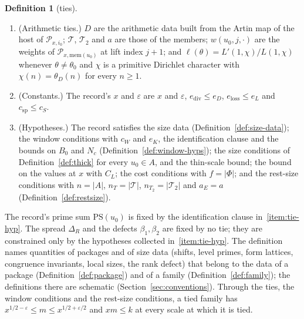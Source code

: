 \documentclass[11pt]{amsbook}
\theoremstyle{plain}
\theoremstyle{definition}
\newtheorem{definition}[theorem]{Definition}
\theoremstyle{remark}
\numberwithin{equation}{section}
\numberwithin{figure}{chapter}
\numberwithin{table}{chapter}
\newcommand{\eps}{\varepsilon}
\newcommand{\PS}{\mathrm{PS}}
\newcommand{\Top}{\mathcal{T}}
\newcommand{\Cg}{\mathrm{Cg}}
\newcommand{\Fo}{\mathrm{Fo}}
\newcommand{\Ga}{\mathrm{Ga}}
\newcommand{\IO}{\mathrm{IO}}
\begin{document}
\begin{definition}[ties]
\begin{enumerate}[label=(\arabic*)]
$\mu_M^{\max}(u)$ are the slope and the maximal slope of the form
lattice of $u$; and
\[
\Cg_j(u)=\sum_{\mathfrak p}\operatorname{sz}_{\mathfrak p}
\bigl(\text{congruence invariant of $u$ at lift index $j+1$}\bigr),
\]
the sum over the places $\mathfrak p$ of the support of the size
datum, with $\operatorname{sz}_{\mathfrak p}$ its local sizes.
For the shift itself, $\mu_R(u_0)$ and $\mu_R^{\min}(u_0)$ are the slope and the
minimal slope of $R^\vee$; $\Fo(u_0)$ and $\Ga(u_0)$ are those of the
size datum; $\IO(u_0)$ is a sum over the support of
local quantities of the size datum; and $\beta_0(u_0)$ is the rank
defect of the member.
\item (Arithmetic ties.) $D$ are the arithmetic data built from the
Artin map of the host of $\mathcal P_{x,i_0}$; $\Top$, $\Top_2$ and
$a$ are those of the members; $w(u_0,j,\cdot)$ are the weights of
$\mathcal P_{x,\mathrm{mem}(u_0)}$ at lift index $j+1$; and
$\ell(\theta)=L'(1,\chi)/L(1,\chi)$ whenever $\theta\ne\theta_0$ and
$\chi$ is a primitive Dirichlet character with $\chi(n)=\theta_D(n)$
for every $n\ge1$.
\item (Constants.) The record's $x$ and $\eps$ are $x$ and $\eps$,
$e_{\mathrm{div}}\le e_D$, $e_{\mathrm{loss}}\le e_L$ and
$c_{\mathrm{sp}}\le c_S$.
\item\label{item:tie-hyp} (Hypotheses.) The record satisfies the size data
(Definition~\ref{def:size-data}); the window conditions with $c_W$ and
$e_K$, the identification clause and the bounds on $B_0$ and $N_c$
(Definition~\ref{def:window-hyps}); the size conditions of
Definition~\ref{def:thick} for every $u_0\in A$, and the thin-scale
bound; the bound on the values at $x$ with $C_L$; the cost conditions
with $f=|\Phi|$; and the rest-size conditions with $n=|A|$,
$n_T=|\Top|$, $n_{T_2}=|\Top_2|$ and $a_E=a$
(Definition~\ref{def:restsize}).
\end{enumerate}
\end{definition}

\noindent The record's prime sum $\PS(u_0)$ is fixed by the
identification clause in~\ref{item:tie-hyp}. The spread $\Delta_R$ and the
defects
$\beta_1,\beta_2$ are fixed by no tie; they are constrained only by
the hypotheses collected in~\ref{item:tie-hyp}. The definition names quantities
of
packages and of size data (shifts, level primes, form lattices,
congruence invariants, local sizes, the rank defect) that belong to the data of
a
package (Definition~\ref{def:package}) and of a family
(Definition~\ref{def:family}); the definitions there are schematic
(Section~\ref{sec:conventions}). Through
the ties, the window conditions and the rest-size conditions, a tied
family has $x^{1/2-\eps}\le m\le x^{1/2+\eps/2}$ and $xm\le k$ at
every scale at which it is tied.
\end{document}
